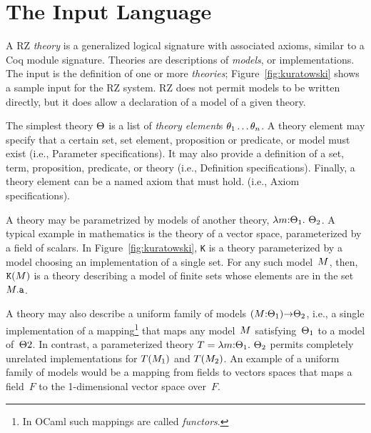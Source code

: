 
\section{The Input Language}
\label{sec:input-language}

A RZ \emph{theory} is a generalized logical signature with associated
axioms, similar to a Coq module signature. Theories are descriptions
of \emph{models}, or implementations. The input is the definition of
one or more \emph{theories}; Figure~\ref{fig:kuratowski} shows a
sample input for the RZ system. RZ does not permit models to be
written directly, but it does allow a declaration of a model of a
given theory.

The simplest theory $\Theta$ is a list of \emph{theory element}\/s
$\theta_1 \ldots \theta_n$. A theory element may specify that a certain
set, set element, proposition or predicate, or model must exist (i.e.,
\textsf{Parameter} specifications). It may also provide a definition
of a set, term, proposition, predicate, or theory (i.e.,
\textsf{Definition} specifications). Finally, a theory element can be
a named axiom that must hold. (i.e., \textsf{Axiom} specifications).

A theory may be parametrized by models of another theory,
$\lambda m{:}\Theta_1.\ \Theta_2$. A typical example in mathematics is
the theory of a vector space, parameterized by a field of scalars. In
Figure~\ref{fig:kuratowski}, \texttt{K} is a theory parameterized by a
model choosing an implementation of a single set. For any such
model~$M$, then, $\mathtt{K}(M)$ is a theory describing a model of
finite sets whose elements are in the set $M{.}\mathtt{a}$.

A theory may also describe a uniform family of models
$(M{:}\Theta_1){\to}\Theta_2$, i.e., a single implementation of a
mapping\footnote{In OCaml such mappings are called \emph{functors}.}
that maps any model~$M$ satisfying~$\Theta_1$ to a model of~$\Theta2$.
In contrast, a parameterized theory $T =
\lambda m{:}\Theta_1.\ \Theta_2$ permits completely unrelated
implementations for $T(M_1)$ and $T(M_2)$. An example of a uniform
family of models would be a mapping from fields to vectors spaces that
maps a field~$F$ to the 1-dimensional vector space over~$F$.



